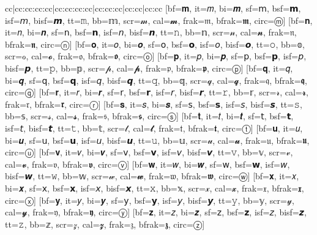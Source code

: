 \documentclass{unittest}
\begin{document}
\begin{tabular}{cc|cc:cc:cc:cc|cc:cc:cc:cc|cc:cc:cc|cc:cc|cc:cc}
[bf=𝐦, it=𝑚, bi=𝒎, sf=𝗆, bsf=𝗺, isf=𝘮, bisf=𝙢, tt=𝚖, bb=𝕞, scr=𝓂, cal=𝓶, frak=𝔪, bfrak=𝖒, circ=ⓜ]
[bf=𝐧, it=𝑛, bi=𝒏, sf=𝗇, bsf=𝗻, isf=𝘯, bisf=𝙣, tt=𝚗, bb=𝕟, scr=𝓃, cal=𝓷, frak=𝔫, bfrak=𝖓, circ=ⓝ]
[bf=𝐨, it=𝑜, bi=𝒐, sf=𝗈, bsf=𝗼, isf=𝘰, bisf=𝙤, tt=𝚘, bb=𝕠, scr=ℴ, cal=𝓸, frak=𝔬, bfrak=𝖔, circ=ⓞ]
[bf=𝐩, it=𝑝, bi=𝒑, sf=𝗉, bsf=𝗽, isf=𝘱, bisf=𝙥, tt=𝚙, bb=𝕡, scr=𝓅, cal=𝓹, frak=𝔭, bfrak=𝖕, circ=ⓟ]
[bf=𝐪, it=𝑞, bi=𝒒, sf=𝗊, bsf=𝗾, isf=𝘲, bisf=𝙦, tt=𝚚, bb=𝕢, scr=𝓆, cal=𝓺, frak=𝔮, bfrak=𝖖, circ=ⓠ]
[bf=𝐫, it=𝑟, bi=𝒓, sf=𝗋, bsf=𝗿, isf=𝘳, bisf=𝙧, tt=𝚛, bb=𝕣, scr=𝓇, cal=𝓻, frak=𝔯, bfrak=𝖗, circ=ⓡ]
[bf=𝐬, it=𝑠, bi=𝒔, sf=𝗌, bsf=𝘀, isf=𝘴, bisf=𝙨, tt=𝚜, bb=𝕤, scr=𝓈, cal=𝓼, frak=𝔰, bfrak=𝖘, circ=ⓢ]
[bf=𝐭, it=𝑡, bi=𝒕, sf=𝗍, bsf=𝘁, isf=𝘵, bisf=𝙩, tt=𝚝, bb=𝕥, scr=𝓉, cal=𝓽, frak=𝔱, bfrak=𝖙, circ=ⓣ]
[bf=𝐮, it=𝑢, bi=𝒖, sf=𝗎, bsf=𝘂, isf=𝘶, bisf=𝙪, tt=𝚞, bb=𝕦, scr=𝓊, cal=𝓾, frak=𝔲, bfrak=𝖚, circ=ⓤ]
[bf=𝐯, it=𝑣, bi=𝒗, sf=𝗏, bsf=𝘃, isf=𝘷, bisf=𝙫, tt=𝚟, bb=𝕧, scr=𝓋, cal=𝓿, frak=𝔳, bfrak=𝖛, circ=ⓥ]
[bf=𝐰, it=𝑤, bi=𝒘, sf=𝗐, bsf=𝘄, isf=𝘸, bisf=𝙬, tt=𝚠, bb=𝕨, scr=𝓌, cal=𝔀, frak=𝔴, bfrak=𝖜, circ=ⓦ]
[bf=𝐱, it=𝑥, bi=𝒙, sf=𝗑, bsf=𝘅, isf=𝘹, bisf=𝙭, tt=𝚡, bb=𝕩, scr=𝓍, cal=𝔁, frak=𝔵, bfrak=𝖝, circ=ⓧ]
[bf=𝐲, it=𝑦, bi=𝒚, sf=𝗒, bsf=𝘆, isf=𝘺, bisf=𝙮, tt=𝚢, bb=𝕪, scr=𝓎, cal=𝔂, frak=𝔶, bfrak=𝖞, circ=ⓨ]
[bf=𝐳, it=𝑧, bi=𝒛, sf=𝗓, bsf=𝘇, isf=𝘻, bisf=𝙯, tt=𝚣, bb=𝕫, scr=𝓏, cal=𝔃, frak=𝔷, bfrak=𝖟, circ=ⓩ]
\bottomrule
\end{tabular}
\end{document}
